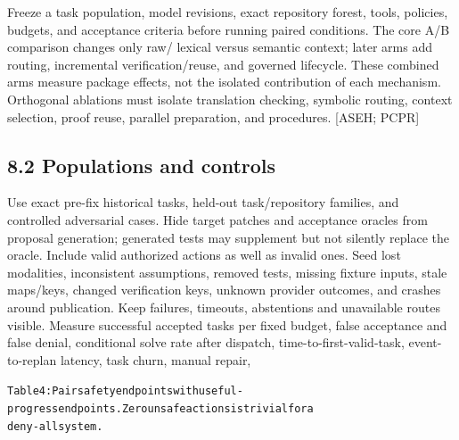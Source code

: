 Freeze a task population, model revisions, exact repository forest, tools, policies, budgets, and
acceptance criteria before running paired conditions. The core A/B comparison changes only raw/
lexical versus semantic context; later arms add routing, incremental verification/reuse, and governed
lifecycle. These combined arms measure package effects, not the isolated contribution of each
mechanism. Orthogonal ablations must isolate translation checking, symbolic routing, context
selection, proof reuse, parallel preparation, and procedures. [ASEH; PCPR]

\subsection*{8.2 Populations and controls}

Use exact pre-fix historical tasks, held-out task/repository families, and controlled adversarial cases.
Hide target patches and acceptance oracles from proposal generation; generated tests may supplement
but not silently replace the oracle. Include valid authorized actions as well as invalid ones. Seed
lost modalities, inconsistent assumptions, removed tests, missing fixture inputs, stale maps/keys,
changed verification keys, unknown provider outcomes, and crashes around publication. Keep
failures, timeouts, abstentions and unavailable routes visible.
Measure successful accepted tasks per fixed budget, false acceptance and false denial, conditional
solve rate after dispatch, time-to-first-valid-task, event-to-replan latency, task churn, manual repair,


\begingroup\fontsize{7}{8.4}\selectfont
\begin{alltt}
Table 4: Pair safety endpoints with useful-progress endpoints. Zero unsafe actions is trivial for a
deny-all system.
\end{alltt}\endgroup

